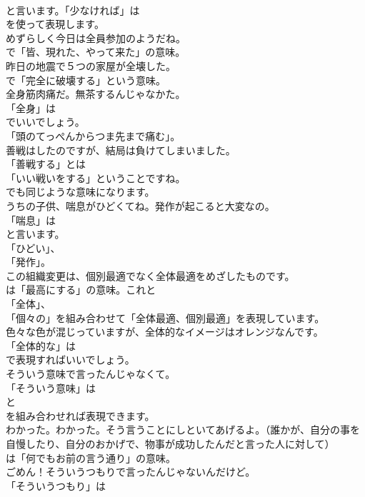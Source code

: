 \documentclass[8pt]{extreport}
\begin{document}
\begin{CJK}{UTF8}{min}
\\	と言います。「少なければ」は
\\	を使って表現します。	
\\	めずらしく今日は全員参加のようだね。 
\\	で「皆、現れた、やって来た」の意味。	
\\	昨日の地震で５つの家屋が全壊した。 
\\	で「完全に破壊する」という意味。	
\\	全身筋肉痛だ。無茶するんじゃなかた。 
\\	「全身」は
\\	でいいでしょう。
\\	「頭のてっぺんからつま先まで痛む」。	
\\	善戦はしたのですが、結局は負けてしまいました。 
\\	「善戦する」とは
\\	「いい戦いをする」ということですね。
\\	でも同じような意味になります。	
\\	うちの子供、喘息がひどくてね。発作が起こると大変なの。 
\\	「喘息」は
\\	と言います。
\\	「ひどい」、
\\	「発作」。	
\\	この組織変更は、個別最適でなく全体最適をめざしたものです。 
\\	は「最高にする」の意味。これと
\\	「全体」、
\\	「個々の」を組み合わせて「全体最適、個別最適」を表現しています。	
\\	色々な色が混じっていますが、全体的なイメージはオレンジなんです。 
\\	「全体的な」は 
\\	で表現すればいいでしょう。	
\\	そういう意味で言ったんじゃなくて。 
\\	「そういう意味」は
\\	と
\\	を組み合わせれば表現できます。	
\\	わかった。わかった。そう言うことにしといてあげるよ。（誰かが、自分の事を自慢したり、自分のおかげで、物事が成功したんだと言った人に対して） 
\\	は「何でもお前の言う通り」の意味。	
\\	ごめん！そういうつもりで言ったんじゃないんだけど。 
\\	「そういうつもり」は

\end{CJK}
\end{document}
